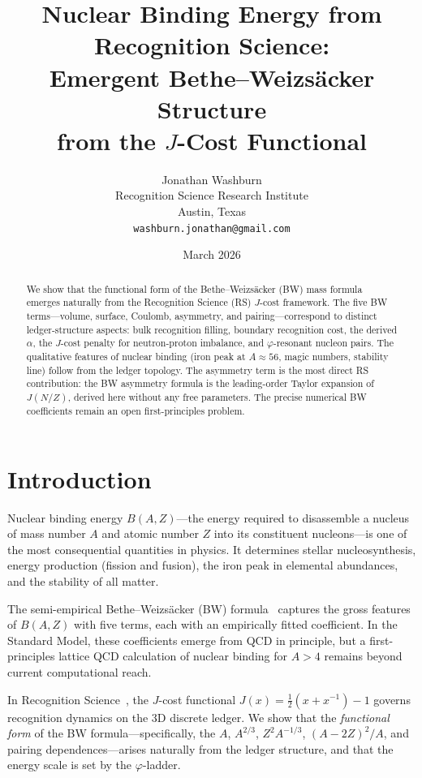 \documentclass[12pt,a4paper]{article}
\title{Nuclear Binding Energy from Recognition Science:\\
Emergent Bethe--Weizs\"acker Structure\\
from the $J$-Cost Functional}
\author{Jonathan Washburn\\
Recognition Science Research Institute\\
Austin, Texas\\
\texttt{washburn.jonathan@gmail.com}}
\date{March 2026}
\theoremstyle{definition}
\theoremstyle{remark}
\begin{document}
\maketitle

\begin{abstract}
We show that the functional form of the Bethe--Weizs\"acker
(BW) mass formula emerges naturally from the Recognition
Science (RS) $J$-cost framework.  The five BW terms---volume,
surface, Coulomb, asymmetry, and pairing---correspond to
distinct ledger-structure aspects: bulk recognition filling,
boundary recognition cost, the derived $\alpha$, the $J$-cost
penalty for neutron-proton imbalance, and $\varphi$-resonant
nucleon pairs.  The qualitative features of nuclear binding
(iron peak at $A \approx 56$, magic numbers, stability line)
follow from the ledger topology.  The asymmetry term is the
most direct RS contribution: the BW asymmetry formula is the
leading-order Taylor expansion of $J(N/Z)$, derived here
without any free parameters.  The precise numerical BW
coefficients remain an open first-principles problem.
\end{abstract}

\section{Introduction}
\label{sec:intro}

Nuclear binding energy $B(A,Z)$---the energy required to
disassemble a nucleus of mass number $A$ and atomic number $Z$
into its constituent nucleons---is one of the most consequential
quantities in physics.  It determines stellar nucleosynthesis,
energy production (fission and fusion), the iron peak in
elemental abundances, and the stability of all matter.

The semi-empirical Bethe--Weizs\"acker (BW)
formula~\cite{BW1935,Bethe1936} captures the gross features of
$B(A,Z)$ with five terms, each with an empirically fitted
coefficient.  In the Standard Model, these coefficients emerge
from QCD in principle, but a first-principles lattice QCD
calculation of nuclear binding for $A > 4$ remains beyond current
computational reach.

In Recognition Science~\cite{RS_Axioms}, the $J$-cost functional
$J(x) = \tfrac{1}{2}(x + x^{-1}) - 1$ governs recognition
dynamics on the 3D discrete ledger.  We show that the
\emph{functional form} of the BW formula---specifically, the
$A$, $A^{2/3}$, $Z^2 A^{-1/3}$, $(A-2Z)^2/A$, and pairing
dependences---arises naturally from the ledger structure, and
that the energy scale is set by the $\varphi$-ladder.
\end{document}
